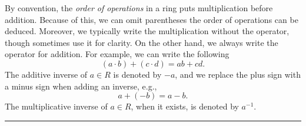 \documentclass[12pt]{article}
\newcommand{\sepline}{\rule{\textwidth}{0.4pt}}
\newenvironment{cd}{\begin{center}\begin{tikzcd}}{\end{tikzcd}\end{center}}
\theoremstyle{definition}
\newcommand{\<}{\left\langle}
\renewcommand{\>}{\right\rangle}
\newcommand{\id}{\mathrm{id}}
\renewcommand{\_}[1]{{_{#1}}}
\begin{document}
By convention, the \emph{order of operations} in a ring puts multiplication before addition.
Because of this, we can omit parentheses the order of operations can be deduced.
Moreover, we typically write the multiplication without the operator, though sometimes use it for clarity.
On the other hand, we always write the operator for addition.
For example, we can write the following
\[
    (a \cdot b) + (c \cdot d) = ab + cd.
\]
The additive inverse of $a \in R$ is denoted by $-a$, and we replace the plus sign with a minus sign when adding an inverse, e.g.,
\[
    a + (-b) = a - b.
\]
The multiplicative inverse of $a \in R$, when it exists, is denoted by $a^{-1}$.




\newpage
\sepline
\end{document}
